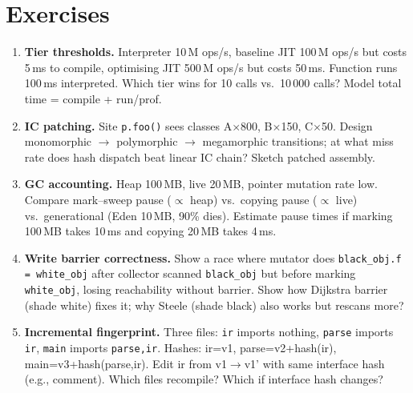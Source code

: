 \section{Exercises}
\label{sec:ch08-exercises}
\begin{enumerate}[label=E8.\arabic*, leftmargin=*, itemsep=0.8em]
\item \textbf{Tier thresholds.} Interpreter 10\,M ops/s, baseline JIT 100\,M ops/s but costs 5\,ms to compile, optimising JIT 500\,M ops/s but costs 50\,ms. Function runs 100\,ms interpreted. Which tier wins for 10 calls vs.\ 10\,000 calls? Model total time = compile + run/prof.
\item \textbf{IC patching.} Site \texttt{p.foo()} sees classes A$\times$800, B$\times$150, C$\times$50. Design monomorphic $\to$ polymorphic $\to$ megamorphic transitions; at what miss rate does hash dispatch beat linear IC chain? Sketch patched assembly.
\item \textbf{GC accounting.} Heap 100\,MB, live 20\,MB, pointer mutation rate low. Compare mark--sweep pause ($\propto$ heap) vs.\ copying pause ($\propto$ live) vs.\ generational (Eden 10\,MB, 90\% dies). Estimate pause times if marking 100\,MB takes 10\,ms and copying 20\,MB takes 4\,ms.
\item \textbf{Write barrier correctness.} Show a race where mutator does \texttt{black\_obj.f = white\_obj} after collector scanned \texttt{black\_obj} but before marking \texttt{white\_obj}, losing reachability without barrier. Show how Dijkstra barrier (shade white) fixes it; why Steele (shade black) also works but rescans more?
\item \textbf{Incremental fingerprint.} Three files: \texttt{ir} imports nothing, \texttt{parse} imports \texttt{ir}, \texttt{main} imports \texttt{parse,ir}. Hashes: ir=v1, parse=v2+hash(ir), main=v3+hash(parse,ir). Edit ir from v1$\to$v1' with same interface hash (e.g., comment). Which files recompile? Which if interface hash changes?
\end{enumerate}


